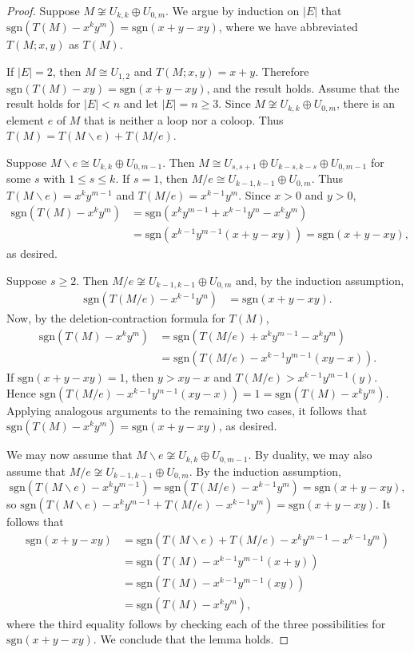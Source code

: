 \documentclass[12pt,reqno]{amsart}
\theoremstyle{definition}
\theoremstyle{remark}
\numberwithin{equation}{section}
\newcommand{\del}{\backslash}
\newcommand{\sgn}{\text{sgn}}
\begin{document}
\begin{proof}
     Suppose $M\not\cong U_{k,k}\oplus U_{0,m}$. We argue by induction on $|E|$ that $\text{sgn}(T(M)-x^ky^m)= \text{sgn}(x+y-xy)$, where we have abbreviated $T(M;x,y)$ as $T(M)$. 
    
    If $|E|=2$, then $M\cong U_{1,2}$ and $T(M;x,y)=x+y$. Therefore $\text{sgn}(T(M)-xy)=\text{sgn}(x+y-xy)$, and the result holds. Assume that the result holds for $|E|<n$ and let $|E|=n\geq 3$. Since $M\not\cong U_{k,k}\oplus U_{0,m}$, there is an element $e$ of $M$ that is neither a loop nor a coloop. 
    Thus $T(M)=T(M\del e)+T(M/e)$.  

    Suppose $M\del e\cong U_{k,k}\oplus U_{0,m-1}$. Then $M\cong U_{s,s+1}\oplus U_{k-s,k-s}\oplus U_{0,m-1}$ for some $s$ with $1\leq s\leq k$. If $s=1$, then $M/e\cong U_{k-1,k-1}\oplus U_{0,m}$. Thus $T(M\del e)=x^{k}y^{m-1}$ and $T(M/e)=x^{k-1}y^m$.
    Since $x>0$ and $y>0$,   
        \begin{align*}
            \sgn(T(M)-x^ky^m)&=\sgn(x^ky^{m-1}+x^{k-1}y^m-x^ky^m)\\
                                   &=\sgn(x^{k-1}y^{m-1}(x+y-xy))=\sgn(x+y-xy),
    \end{align*}
   as desired.  

    Suppose $s\geq 2$. Then $M/e\not\cong U_{k-1,k-1}\oplus U_{0,m}$ and, by the induction assumption,  
        \begin{align*}
        \sgn(T(M/e)-x^{k-1}y^{m})
         &=\sgn(x+y-xy).
        \end{align*}
    Now, by the deletion-contraction formula for $T(M)$, 
     \begin{align*}
            \sgn(T(M)-x^ky^m)&=\text{sgn}(T(M/e)+x^ky^{m-1}-x^ky^m)\\
            &=\sgn(T(M/e)-x^{k-1}y^{m-1}(xy-x)).
        \end{align*}
    If $\sgn(x+y-xy)=1$, then $y>xy-x$ and $T(M/e)>x^{k-1}y^{m-1}(y)$. Hence $\text{sgn}(T(M/e)-x^{k-1}y^{m-1}(xy-x))=1=\text{sgn}(T(M)-x^ky^m)$. Applying analogous arguments to the remaining two cases, it follows that $\text{sgn}(T(M)-x^ky^m)=\text{sgn}(x+y-xy)$, as desired.

    We may now assume that $M\del e\not\cong U_{k,k}\oplus U_{0,m-1}$. By duality, we may also assume that $M/e\not\cong U_{k-1,k-1}\oplus U_{0,m}$. By the induction assumption, 
    \[
        \text{sgn}(T(M\del e)-x^ky^{m-1})=\text{sgn}(T(M/e)-x^{k-1}y^m)=\text{sgn}(x+y-xy),
    \]
    so $\text{sgn}(T(M\del e)-x^ky^{m-1}+T(M/e)-x^{k-1}y^m)=\text{sgn}(x+y-xy).$
    It follows that  
        \begin{align*}
            \text{sgn}(x+y-xy)
            &=\text{sgn}(T(M\del e)+T(M/e)-x^ky^{m-1}-x^{k-1}y^m)\\
            &=\text{sgn}(T(M)-x^{k-1}y^{m-1}(x+y))\\
            &=\text{sgn}(T(M)-x^{k-1}y^{m-1}(xy))\\
            &=\text{sgn}(T(M)-x^ky^m),
        \end{align*} 
    where the third equality follows by checking each of the three possibilities for $\sgn(x+y-xy).$ We conclude that the lemma holds. 
\end{proof}
\end{document}
